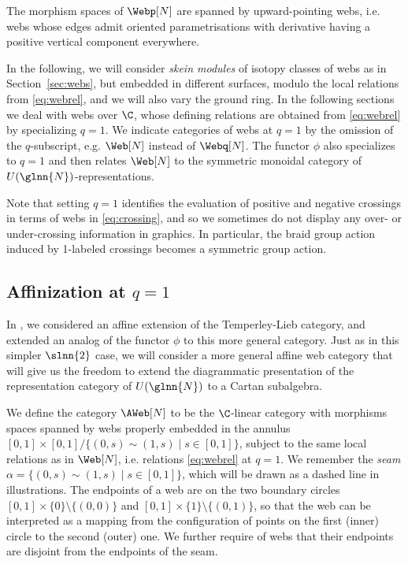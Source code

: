 \begin{lemma}\label{lem:upward} The morphism spaces of $\Webp[N]$ are spanned by
upward-pointing webs, i.e. webs whose edges admit oriented parametrisations with
derivative having a positive vertical component everywhere.
\end{lemma} 
  
In the following, we will consider \emph{skein modules} of isotopy classes of
webs as in Section~\ref{sec:webs}, but embedded in different surfaces, modulo
the local relations from \eqref{eq:webrel}, and we will also vary the ground
ring. In the following sections we deal with webs over $\C$, whose defining
relations are obtained from \eqref{eq:webrel} by specializing $q=1$. We indicate
categories of webs at $q=1$ by the omission of the $q$-subscript, e.g. $\Web[N]$
instead of $\Webq[N]$. The functor $\phi$ also specializes to $q=1$ and then
relates $\Web[N]$ to the symmetric monoidal category of
$U(\glnn{N})$-representations.

Note that setting $q=1$ identifies the evaluation of positive and negative crossings in terms of webs in \eqref{eq:crossing}, and so we sometimes do not display any over- or under-crossing information in graphics. In particular, the braid group action induced by 1-labeled crossings becomes a symmetric group action.

  
\subsection{Affinization at \texorpdfstring{$q=1$}{q=1}}
In \cite{QW}, we considered an affine extension of the Temperley-Lieb category, and extended an analog of the functor $\phi$ to this more general category. Just as in this simpler $\slnn{2}$ case, we will consider a more general affine web category that will give us the freedom to extend the diagrammatic presentation of the representation category of $U(\glnn{N})$ to a Cartan subalgebra.


We define the category $\AWeb[N]$ to be the $\C$-linear category with morphisms
spaces spanned by webs properly embedded in the annulus $[0,1]\times
[0,1]/\{(0,s)\sim (1,s)\mid s\in [0,1]\}$, subject to the same local relations
as in $\Web[N]$, i.e. relations \eqref{eq:webrel} at $q=1$. We remember the
\textit{seam} $\alpha=\{(0,s)\sim (1,s)\mid s\in [0,1]\}$, which will be drawn
as a dashed line in illustrations. The endpoints of a web are on the two
boundary circles $[0,1]\times \{0\}\setminus\{(0,0)\}$ and $[0,1]\times
\{1\}\setminus\{(0,1)\} $, so that the web can be interpreted as a mapping
from the configuration of points on the first (inner) circle to the second (outer) one. We further require of webs that their
endpoints are disjoint from the endpoints of the seam.

